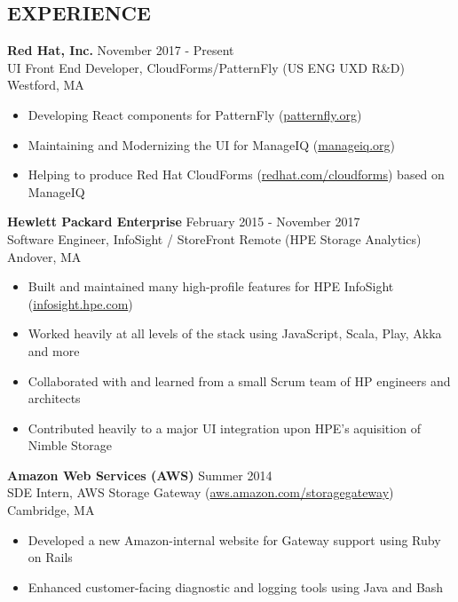 \documentclass[line,margin]{res}
\begin{document}
\begin{resume}
\section{EXPERIENCE}
	{\large \textbf{Red Hat, Inc.}}
    \hfill November 2017 - Present \\
    UI Front End Developer, CloudForms/PatternFly (US ENG UXD R\&D)
    \hfill Westford, MA
    \begin{itemize}  \itemsep -2pt %
        \item Developing React components for PatternFly (\href{https://www.patternfly.org/}{patternfly.org})
        \item Maintaining and Modernizing the UI for ManageIQ (\href{http://manageiq.org/}{manageiq.org})
        \item Helping to produce Red Hat CloudForms (\href{https://www.redhat.com/en/technologies/management/cloudforms}{redhat.com/cloudforms}) based on ManageIQ
    \end{itemize}

    {\large \textbf{Hewlett Packard Enterprise}}
    \hfill February 2015 - November 2017 \\
    Software Engineer, InfoSight / StoreFront Remote (HPE Storage Analytics)
    \hfill Andover, MA
    \begin{itemize}  \itemsep -2pt %
        \item Built and maintained many high-profile features for HPE InfoSight (\href{https://infosight.hpe.com/}{infosight.hpe.com})
        \item Worked heavily at all levels of the stack using JavaScript, Scala, Play, Akka and more
        \item Collaborated with and learned from a small Scrum team of HP engineers and architects
        \item Contributed heavily to a major UI integration upon HPE's aquisition of Nimble Storage
    \end{itemize}

    {\large \textbf{Amazon Web Services (AWS)}}
    \hfill Summer 2014 \\
    SDE Intern, AWS Storage Gateway (\href{https://aws.amazon.com/storagegateway/}{aws.amazon.com/storagegateway})
    \hfill Cambridge, MA
    \begin{itemize}  \itemsep -2pt
        \item Developed a new Amazon-internal website for Gateway support using Ruby on Rails
        \item Enhanced customer-facing diagnostic and logging tools using Java and Bash
    \end{itemize}


\end{resume}
\end{document}
